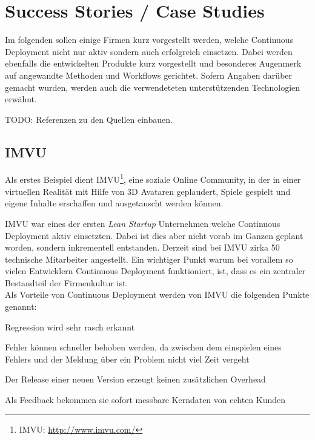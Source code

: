 \section{Success Stories / Case Studies}

Im folgenden sollen einige Firmen kurz vorgestellt werden, welche Continuous
Deployment nicht nur aktiv sondern auch erfolgreich einsetzen. Dabei werden
ebenfalls die entwickelten Produkte kurz vorgestellt und besonderes Augenmerk
auf angewandte Methoden und Workflows gerichtet. Sofern Angaben darüber
gemacht wurden, werden auch die  verwendeteten unterstützenden Technologien
erwähnt.

\begin{wichtigbox}
TODO: Referenzen zu den Quellen einbauen.
\end{wichtigbox}

\subsection{IMVU}
\label{subsec:imvu}

Als erstes Beispiel dient IMVU\footnote{IMVU: \url{http://www.imvu.com/}},
eine soziale Online Community, in der in einer virtuellen Realität mit Hilfe
von 3D Avataren geplaudert, Spiele gespielt und eigene Inhalte erschaffen und
ausgetauscht werden können.

IMVU war eines der ersten \emph{Lean Startup} Unternehmen welche Continuous
Deployment aktiv einsetzten. Dabei ist dies aber nicht vorab im Ganzen geplant
worden, sondern inkrementell entstanden. Derzeit sind bei IMVU zirka 50
technische Mitarbeiter angestellt. Ein wichtiger Punkt warum bei vorallem so
vielen Entwicklern Continuous Deployment funktioniert, ist, dass es ein
zentraler Bestandteil der Firmenkultur ist. \\
Als Vorteile von Continuous Deployment werden von IMVU die folgenden Punkte
genannt:

\begin{itemize*}
    \item Regression wird sehr rasch erkannt
    \item Fehler können schneller behoben werden, da zwischen dem einspielen
          eines Fehlers und der Meldung über ein Problem nicht viel Zeit vergeht
    \item Der Release einer neuen Version erzeugt keinen zusätzlichen Overhead
    \item Als Feedback bekommen sie sofort messbare Kerndaten von echten Kunden
\end{itemize*}

